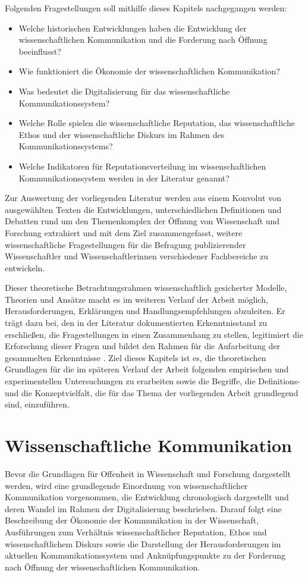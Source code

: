 Folgenden Fragestellungen soll mithilfe dieses Kapitels nachgegangen werden:
\begin{itemize}
\item Welche historischen Entwicklungen haben die Entwicklung der wissenschaftlichen Kommunikation und die Forderung nach Öffnung beeinflusst?
\item Wie funktioniert die Ökonomie der wissenschaftlichen Kommunikation?
\item Was bedeutet die Digitalisierung für das wissenschaftliche Kommunikationssystem?
\item Welche Rolle spielen die wissenschaftliche Reputation, das wissenschaftliche Ethos und der wissenschaftliche Diskurs im Rahmen des Kommunikationssystems?
\item Welche Indikatoren für Reputationsverteilung im wissenschaftlichen Kommunikationssystem werden in der Literatur genannt?
\end{itemize}

Zur Auswertung der vorliegenden Literatur werden aus einem Konvolut von ausgewählten Texten die Entwicklungen, unterschiedlichen Definitionen und Debatten rund um den Themenkomplex der Öffnung von Wissenschaft und Forschung extrahiert und mit dem Ziel zusammengefasst, weitere wissenschaftliche Fragestellungen für die Befragung publizierender Wissenschaftler und Wissenschaftlerinnen verschiedener Fachbereiche zu entwickeln.

Dieser theoretische Betrachtungsrahmen wissenschaftlich gesicherter Modelle, Theorien und Ansätze macht es im weiteren Verlauf der Arbeit möglich, Herausforderungen, Erklärungen und Handlungsempfehlungen abzuleiten. Er trägt dazu bei, den in der Literatur dokumentierten
Erkenntnisstand zu erschließen, die Fragestellungen in einen Zusammenhang zu stellen, legitimiert die Erforschung dieser Fragen und bildet den Rahmen für die Aufarbeitung der gesammelten Erkenntnisse \cite[:109]{Kornmeier_2007}. Ziel dieses Kapitels ist es, die theoretischen Grundlagen für die im späteren Verlauf der Arbeit folgenden empirischen und experimentellen Untersuchungen zu erarbeiten sowie die Begriffe, die Definitions- und die Konzeptvielfalt, die für das Thema der vorliegenden Arbeit grundlegend sind, einzuführen.

\section{Wissenschaftliche Kommunikation}

Bevor die Grundlagen für Offenheit in Wissenschaft und Forschung dargestellt werden, wird eine grundlegende Einordnung von wissenschaftlicher Kommunikation vorgenommen, die Entwicklung chronologisch dargestellt und deren Wandel im Rahmen der Digitalisierung beschrieben. Darauf folgt eine Beschreibung der Ökonomie der Kommunikation in der Wissenschaft, Ausführungen zum Verhältnis wissenschaftlicher Reputation, Ethos und wissenschaftlichem Diskurs sowie die Darstellung der Herausforderungen im aktuellen Kommunikationssystem und Anknüpfungspunkte zu der Forderung nach Öffnung der wissenschaftlichen Kommunikation.

